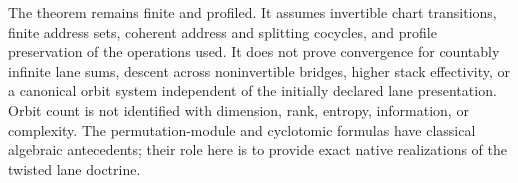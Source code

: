 \begin{boundary}
\label{bnd:block16-finite-twisted-scope}
The theorem remains finite and profiled.  It assumes invertible chart
transitions, finite address sets, coherent address and splitting cocycles, and
profile preservation of the operations used.  It does not prove convergence
for countably infinite lane sums, descent across noninvertible bridges, higher
stack effectivity, or a canonical orbit system independent of the initially
declared lane presentation.  Orbit count is not identified with dimension,
rank, entropy, information, or complexity.  The permutation-module and
cyclotomic formulas have classical algebraic antecedents; their role here is to
provide exact native realizations of the twisted lane doctrine.
\end{boundary}
